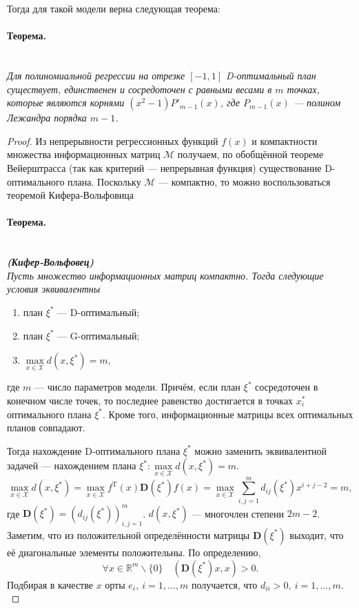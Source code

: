 \documentclass[12pt, a4paper]{article}
\newenvironment{theorem}{\paragraph{Теорема.}\hfill\\\itshape}{\par}
\newcommand{\R}{\mathbb{R}}
\begin{document}
	Тогда для такой модели верна следующая теорема:
	\begin{theorem}
		Для полиномиальной регрессии на отрезке $[-1,1]$ D-оптимальный план существует, единственен и сосредоточен с равными весами в $m$ точках, которые являются корнями $(x^2 - 1)P'_{m-1}(x)$, где $P_{m-1}(x)$ --- полином Лежандра порядка $m-1$.
	\end{theorem}
	\begin{proof}
		Из непрерывности регрессионных функций $f(x)$ и компактности множества информационных матриц $\mathcal{M}$ получаем, по обобщённой теореме Вейерштрасса (так как критерий --- непрерывная функция) существование D-оптимального плана. Поскольку $\mathcal{M}$ --- компактно, то можно воспользоваться теоремой Кифера-Вольфовица
		\begin{theorem}\textbf{(Кифер-Вольфовец)}\\
			Пусть множество информационных матриц компактно. Тогда следующие условия эквивалентны
			\begin{enumerate}
				\item план $\xi^*$ --- D-оптимальный;
				\item план $\xi^*$ --- G-оптимальный;
				\item $\max\limits_{x\in\mathcal{X}}d(x,\xi^*)=m$, 
			\end{enumerate}
			где $m$ --- число параметров модели. Причём, если план $\xi^*$ сосредоточен в конечном числе точек, то последнее равенство достигается в точках $x_i^*$ оптимального плана $\xi^*$. Кроме того, информационные матрицы всех оптимальных планов совпадают.
		\end{theorem} 
		Тогда нахождение D-оптимального плана $\xi^*$ можно заменить эквивалентной задачей --- нахождением плана $\xi^*:\max\limits_{x\in\mathcal{X}}d(x,\xi^*)=m$.
		\begin{equation*}
			\max_{x\in\mathcal{X}}d(x,\xi^*)=\max_{x\in\mathcal{X}}f^\mathrm{T}(x)\mathbf{D}(\xi^*)f(x)=\max_{x\in\mathcal{X}}\sum_{i,j=1}^md_{ij}(\xi^*)x^{i+j-2}=m,
		\end{equation*}
		где $\mathbf{D}(\xi^*)=(d_{ij}(\xi^*))_{i,j=1}^m$. $d(x,\xi^*)$ --- многочлен степени $2m-2$. Заметим, что из положительной определённости матрицы $\mathbf{D}(\xi^*)$ выходит, что её диагональные элементы положительны. По определению,
		\begin{equation*}
			\forall x\in\R^m\backslash\{0\}\quad(\mathbf{D}(\xi^*)x,x)>0.
		\end{equation*}
		Подбирая в качестве $x$ орты $e_i,~i=1,\dots, m$ получается, что $d_{ii}>0,~i=1,\dots, m$.\\

\end{proof}
\end{document}
